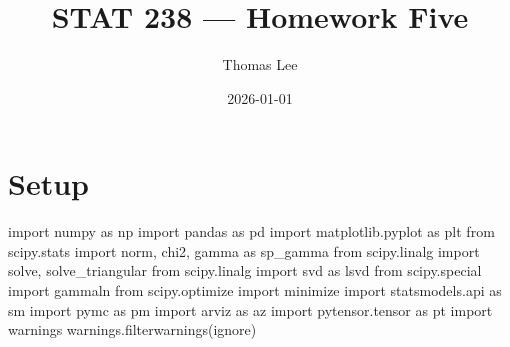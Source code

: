 \documentclass[
  letterpaper,
  DIV=11,
  numbers=noendperiod]{scrartcl}
\title{STAT 238 --- Homework Five}
\author{Thomas Lee}
\date{2026-01-01}
\newenvironment{Shaded}{\begin{snugshade}}{\end{snugshade}}
\newcommand{\ImportTok}[1]{\textcolor[rgb]{0.00,0.46,0.62}{#1}}
\newcommand{\NormalTok}[1]{\textcolor[rgb]{0.00,0.23,0.31}{#1}}
\newcommand{\StringTok}[1]{\textcolor[rgb]{0.13,0.47,0.30}{#1}}
\begin{document}
\maketitle


\section{Setup}\label{setup}

\begin{Shaded}
\begin{Highlighting}[]
\ImportTok{import}\NormalTok{ numpy }\ImportTok{as}\NormalTok{ np}
\ImportTok{import}\NormalTok{ pandas }\ImportTok{as}\NormalTok{ pd}
\ImportTok{import}\NormalTok{ matplotlib.pyplot }\ImportTok{as}\NormalTok{ plt}
\ImportTok{from}\NormalTok{ scipy.stats }\ImportTok{import}\NormalTok{ norm, chi2, gamma }\ImportTok{as}\NormalTok{ sp\_gamma}
\ImportTok{from}\NormalTok{ scipy.linalg }\ImportTok{import}\NormalTok{ solve, solve\_triangular}
\ImportTok{from}\NormalTok{ scipy.linalg }\ImportTok{import}\NormalTok{ svd }\ImportTok{as}\NormalTok{ lsvd}
\ImportTok{from}\NormalTok{ scipy.special }\ImportTok{import}\NormalTok{ gammaln}
\ImportTok{from}\NormalTok{ scipy.optimize }\ImportTok{import}\NormalTok{ minimize}
\ImportTok{import}\NormalTok{ statsmodels.api }\ImportTok{as}\NormalTok{ sm}
\ImportTok{import}\NormalTok{ pymc }\ImportTok{as}\NormalTok{ pm}
\ImportTok{import}\NormalTok{ arviz }\ImportTok{as}\NormalTok{ az}
\ImportTok{import}\NormalTok{ pytensor.tensor }\ImportTok{as}\NormalTok{ pt}
\ImportTok{import}\NormalTok{ warnings}
\NormalTok{warnings.filterwarnings(}\StringTok{\textquotesingle{}ignore\textquotesingle{}}\NormalTok{)}
\end{Highlighting}
\end{Shaded}
\end{document}
